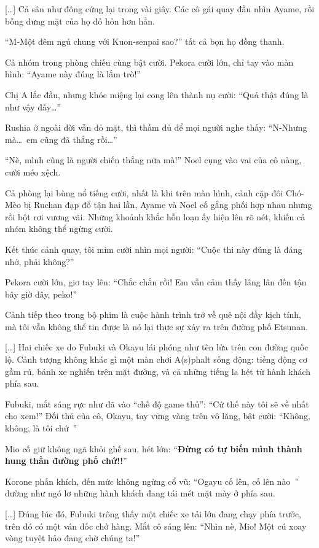 \documentclass[../main.tex]{subfiles}
\begin{document}
[\dots] Cả sân như đông cứng lại trong vài giây. Các cô gái quay đầu nhìn Ayame, rồi bỗng dưng mặt của họ đỏ hỏn hơn hẳn.

``M-Một đêm ngủ chung với Kuon-senpai sao?'' tất cả bọn họ đồng thanh.

\il

Cả nhóm trong phòng chiếu cùng bật cười. Pekora cười lớn, chỉ tay vào màn hình: ``Ayame này đúng là lắm trò!''

Chị A lắc đầu, nhưng khóe miệng lại cong lên thành nụ cười: ``Quả thật đúng là như vậy đấy\dots''

Rushia ở ngoài đời vẫn đỏ mặt, thì thầm đủ để mọi người nghe thấy: ``N-Nhưng mà\dots\ em cũng đã thắng rồi\dots''

``Nè, mình cũng là người chiến thắng nữa mà!'' Noel cụng vào vai của cô nàng, cười méo xệch.

Cả phòng lại bùng nổ tiếng cười, nhất là khi trên màn hình, cảnh cặp đôi Chó-Mèo bị Ruchan đạp đổ tận hai lần, Ayame và Noel cố gắng phối hợp nhau nhưng rồi bột rơi vương vãi. Những khoảnh khắc hỗn loạn ấy hiện lên rõ nét, khiến cả nhóm không thể ngừng cười.

Kết thúc cảnh quay, tôi mỉm cười nhìn mọi người: ``Cuộc thi này đúng là đáng nhớ, phải không?''

Pekora cười lớn, giơ tay lên: ``Chắc chắn rồi! Em vẫn cảm thấy lâng lân đến tận bây giờ đây, peko!''

Cảnh tiếp theo trong bộ phim là cuộc hành trình trở về quê nội đầy kịch tính, mà tôi vẫn không thể tin được là nó lại thực sự xảy ra trên đường phố Etsunan.

\il

[\dots] Hai chiếc xe do Fubuki và Okayu lái phóng như tên lửa trên con đường quốc lộ. Cảnh tượng không khác gì một màn chơi A(s)phalt sống động: tiếng động cơ gầm rú, bánh xe nghiến trên mặt đường, và cả những tiếng la hét từ hành khách phía sau.

Fubuki, mắt sáng rực như đã vào ``chế độ game thủ'': ``Cứ thế này tôi sẽ về nhất cho xem!'' Đối thủ của cô, Okayu, tay vững vàng trên vô lăng, bật cười: ``Không, không, là tôi chứ~''

Mio cố giữ không ngã khỏi ghế sau, hét lớn: ``\textbf{Đừng có tự biến mình thành hung thần đường phố chứ!!}''

Korone phấn khích, đến mức không ngừng cổ vũ: ``Ogayu cố lên, cố lên nào~'' dường như ngó lơ những hành khách đang tái mét mặt mày ở phía sau.

    [\dots] Đúng lúc đó, Fubuki trông thấy một chiếc xe tải lớn đang chạy phía trước, trên đó có một ván dốc chở hàng. Mắt cô sáng lên: ``Nhìn nè, Mio! Một cú xoay vòng tuyệt hảo đang chờ chúng ta!''
\end{document}
